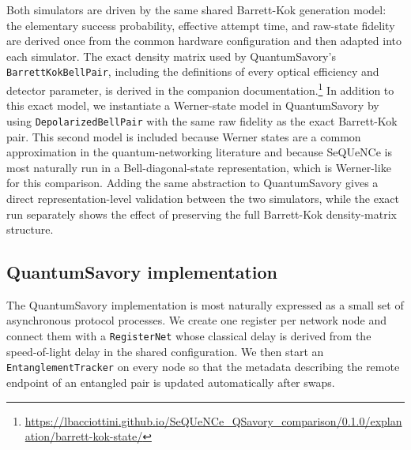 Both simulators are driven by the same shared Barrett-Kok generation model:
the elementary success probability, effective attempt time, and raw-state
fidelity are derived once from the common hardware configuration and then
adapted into each simulator.  The exact density matrix used by QuantumSavory's
\texttt{BarrettKokBellPair}, including the definitions of every optical
efficiency and detector parameter, is derived in the companion
documentation.\footnote{\url{https://lbacciottini.github.io/SeQUeNCe_QSavory_comparison/0.1.0/explanation/barrett-kok-state/}}
In addition to this exact model, we instantiate a Werner-state model in
QuantumSavory by using \texttt{DepolarizedBellPair} with the same raw fidelity
as the exact Barrett-Kok pair.  This second model is included because Werner
states are a common approximation in the quantum-networking literature and
because SeQUeNCe is most naturally run in a Bell-diagonal-state representation,
which is Werner-like for this comparison.  Adding the same abstraction to
QuantumSavory gives a direct representation-level validation between the two
simulators, while the exact run separately shows the effect of preserving the
full Barrett-Kok density-matrix structure.

\subsection{QuantumSavory implementation}

The QuantumSavory implementation is most naturally expressed as a small set of
asynchronous protocol processes.  We create one register per network node and
connect them with a \texttt{RegisterNet} whose classical delay is derived from
the speed-of-light delay in the shared configuration.  We then start an
\texttt{EntanglementTracker} on every node so that the metadata describing the
remote endpoint of an entangled pair is updated automatically after swaps.

